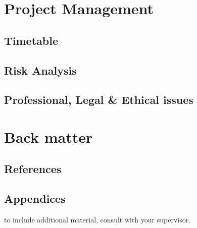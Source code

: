 \documentclass[11pt]{article}
\begin{document}
\section{Project Management}
\subsection{Timetable}

\subsection{Risk Analysis}

\subsection{Professional, Legal \& Ethical issues}

\section{Back matter}
\subsection{References}
\printbibliography

\subsection{Appendices}
to include additional material, consult with your supervisor.
\end{document}
